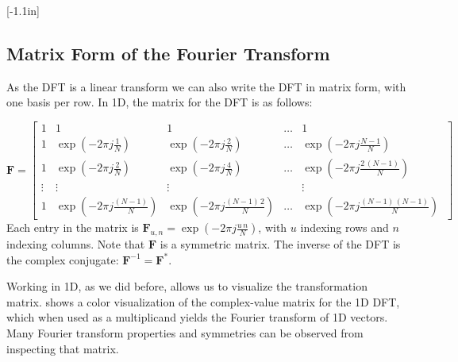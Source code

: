 [-1.1in]

\subsection{Matrix Form of the Fourier Transform}



As the DFT is a linear transform we can also write the DFT in matrix form, with one basis per row. In 1D, the matrix for the DFT is as follows:

\begin{equation}
	\mathbf{F} = \begin{bmatrix}
		1      & 1                                            & 1                                                & \dots & 1                                                     \\ %
		1      & \exp{ \left(-2\pi j \frac{1}{N} \right)}     & \exp{ \left(-2\pi j \frac{2}{N} \right)}         & \dots & \exp{ \left(-2\pi j \frac{N-1}{N} \right)}            \\ %
		1      & \exp{ \left(-2\pi j \frac{2}{N} \right)}     & \exp{ \left(-2\pi j \frac{4}{N} \right)}         & \dots & \exp{ \left(-2\pi j \frac{2\, (N-1)}{N} \right)}      \\ %
		\vdots & \vdots                                       & \vdots                                           & ~     & \vdots                                                \\
		1      & \exp{ \left(-2\pi j \frac{(N-1)}{N} \right)} & \exp{ \left(-2\pi j \frac{(N-1)\, 2}{N} \right)} & \dots & \exp{ \left(-2\pi j \frac{(N-1)\, (N-1)}{N} \right)}\
	\end{bmatrix}
\end{equation}
Each entry in the matrix is $\mathbf{F}_{u,n} = \exp{ \left(-2\pi j \frac{u\, n}{N} \right)}$, with $u$ indexing rows and $n$ indexing columns. Note that $\mathbf{F}$ is a symmetric matrix. The inverse of the DFT is the complex conjugate: $\mathbf{F}^{-1} = \mathbf{F}^{*}$.

Working in 1D, as we did before, allows us to visualize the transformation matrix. \Fig{\ref{fig:colorDFT}} shows a color visualization of the
complex-value matrix for the 1D DFT, which when used as a multiplicand yields the Fourier transform of 1D vectors.  Many Fourier transform properties and symmetries can be observed from inspecting that matrix. %


